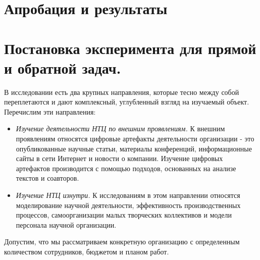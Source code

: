 \section{Апробация и результаты}
\label{section:experiment}

\section{Постановка эксперимента для прямой и обратной задач.}
В исследовании есть два крупных направления, которые тесно между собой переплетаются и дают комплексный, углубленный взгляд на изучаемый объект.
Перечислим эти направления: 

\begin{itemize}
\item \textit{Изучение деятельности НТЦ по внешним проявлениям.} 
К внешним проявлениям относятся цифровые артефакты деятельности организации - это опубликованные научные статьи, материалы конференций, информационные сайты в сети Интернет и новости о компании.  
Изучение цифровых артефактов производится с помощью подходов, основанных на анализе текстов и соавторов. 
\item \textit{Изучение НТЦ изнутри.} 
К исследованиям в этом направлении относятся моделирование научной деятельности, эффективность производственных процессов, самоорганизации малых творческих коллективов и модели персонала научной организации.
\end{itemize}

Допустим, что мы рассматриваем конкретную организацию с определенным
количеством сотрудников, бюджетом и планом работ. 

